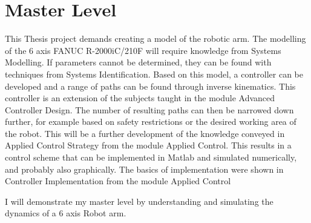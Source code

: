 
\chapter{Master Level}

This Thesis project demands creating a model of the robotic arm. The modelling of the 6 axis FANUC R-2000iC/210F will require knowledge from Systems Modelling. If parameters cannot be determined, they can be found with techniques from Systems Identification. 
Based on this model, a controller can be developed and a range of paths can be found through inverse kinematics. This controller is an extension of the subjects taught in the module Advanced Controller Design. 
The number of resulting paths can then be narrowed down further, for example based on safety restrictions or the desired working area of the robot. This will be a further development of the knowledge conveyed in Applied Control Strategy from the module Applied Control. 
This results in a control scheme that can be implemented in Matlab and simulated numerically, and probably also graphically. The basics of implementation were shown in Controller Implementation from the module Applied Control

I will demonstrate my master level by understanding and simulating the dynamics of a 6 axis Robot arm. 


